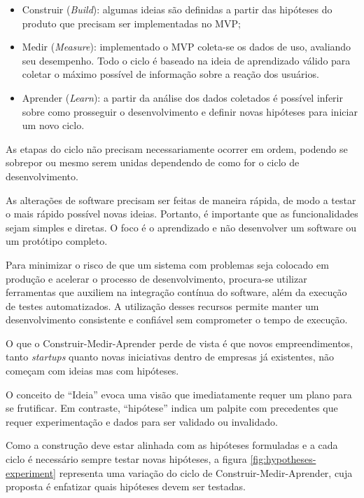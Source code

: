 \begin{itemize}
\item Construir (\emph{Build}): algumas ideias são definidas a partir das hipóteses do produto que precisam ser implementadas no MVP;
\item Medir (\emph{Measure}): implementado o MVP coleta-se os dados de uso, avaliando seu desempenho. Todo o ciclo é baseado na ideia de aprendizado válido para coletar o máximo possível de informação sobre a reação dos usuários.
\item Aprender (\emph{Learn}): a partir da análise dos dados coletados é possível inferir sobre como prosseguir o desenvolvimento e definir novas hipóteses para iniciar um novo ciclo.
\end{itemize}
\par As etapas do ciclo não precisam necessariamente ocorrer em ordem, podendo se sobrepor ou mesmo serem unidas dependendo de como for o ciclo de desenvolvimento.  \citep{ries:11}
\par As alterações de software precisam ser feitas de maneira rápida, de modo a testar o mais rápido possível novas ideias. Portanto, é importante que as funcionalidades sejam simples e diretas. O foco é o aprendizado e não desenvolver um software ou um protótipo completo.
\par Para minimizar o risco de que um sistema com problemas seja colocado em produção e acelerar o processo de desenvolvimento, procura-se utilizar ferramentas que auxiliem na integração contínua do software, além da execução de testes automatizados. A utilização desses recursos permite manter um desenvolvimento consistente e confiável sem comprometer o tempo de execução.
\par O que o Construir-Medir-Aprender perde de vista é que novos empreendimentos, tanto \emph{startups} quanto novas iniciativas dentro de empresas já existentes, não começam com ideias mas com hipóteses.
\par O conceito de ``Ideia'' evoca uma visão que imediatamente requer um plano para se frutificar. Em contraste, ``hipótese'' indica um palpite com precedentes que requer experimentação e dados para ser validado ou invalidado. \citep{blankendeavor}
\par Como a construção deve estar alinhada com as hipóteses formuladas e a cada ciclo é necessário sempre testar novas hipóteses, a figura \ref{fig:hypotheses-experiment} representa uma variação do ciclo de Construir-Medir-Aprender, cuja proposta é enfatizar quais hipóteses devem ser testadas.
